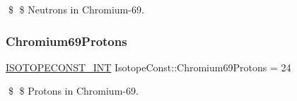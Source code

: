 \$ \$ Neutrons in Chromium-\/69. \mbox{\label{group___isotope_const-_chromium-_cr69_ga52329eed98ddef5f6b4d1d3c1754992f}} 
\subsubsection{\texorpdfstring{Chromium69\+Protons}{Chromium69Protons}}
{\footnotesize\ttfamily \mbox{\hyperlink{group___isotope_const-_macros_ga5f18360b3e99483a35c32d789e62621c}{I\+S\+O\+T\+O\+P\+E\+C\+O\+N\+S\+T\+\_\+\+I\+NT}} Isotope\+Const\+::\+Chromium69\+Protons = 24}

\$ \$ Protons in Chromium-\/69. 